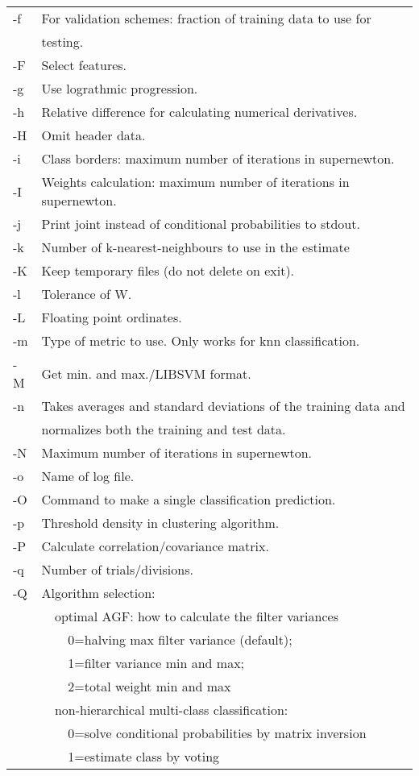 \documentclass[12pt]{article}
\begin{document}
\begin{tabular}{ll}
-f & For validation schemes:  fraction of training data to use for \\
   & testing.\\
-F & Select features.\\
-g & Use lograthmic progression.\\
-h & Relative difference for calculating numerical derivatives.\\
-H & Omit header data.\\
-i & Class borders: maximum number of iterations in supernewton.\\
-I & Weights calculation: maximum number of iterations in supernewton.\\
-j & Print joint instead of conditional probabilities to stdout.\\
-k & Number of k-nearest-neighbours to use in the estimate\\
-K & Keep temporary files (do not delete on exit).\\
-l & Tolerance of W.\\
-L & Floating point ordinates.\\
-m & Type of metric to use.  Only works for knn classification.\\
-M & Get min. and max./LIBSVM format.\\
-n & Takes averages and standard deviations of the training data and \\
 & normalizes both the training and test data.\\
-N & Maximum number of iterations in supernewton.\\
-o & Name of log file.\\
-O & Command to make a single classification prediction.\\
-p & Threshold density in clustering algorithm.\\
-P & Calculate correlation/covariance matrix.\\
-q & Number of trials/divisions.\\
-Q & Algorithm selection:\\
  & \verb/  /optimal AGF: how to calculate the filter variances\\
  & \verb/    /0=halving max filter variance (default);\\
  & \verb/    /1=filter variance min and max;\\
  & \verb/    /2=total weight min and max\\
  & \verb/  /non-hierarchical multi-class classification:\\
  & \verb/    /0=solve conditional probabilities by matrix inversion\\
  & \verb/    /1=estimate class by voting
\end{tabular}
\end{document}

